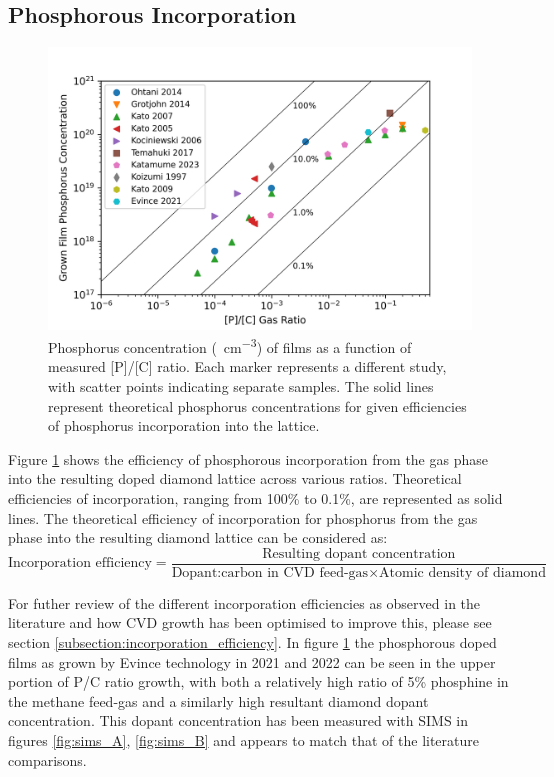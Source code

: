 \begin{refsection}
\subsection{Phosphorous Incorporation}
\begin{figure}[H]
\centering
\includegraphics[width=\textwidth]{grown concentration vs gas ratio.png}
\caption{Phosphorus concentration (\si{\atoms\per\centi\metre\cubed}) of films as a function of measured [P]/[C] ratio. Each marker represents a different study, with scatter points indicating separate samples. The solid lines represent theoretical phosphorus concentrations for given efficiencies of phosphorus incorporation into the lattice. \cite{ohtani2014,grotjohn2014,kato2007,kato2005, kociniewski2006, temahuki2017, katamune2023, koizumi1997, kato2009}}
\label{fig:phos_concentration}
\end{figure}
Figure \ref{fig:phos_concentration} shows the efficiency of phosphorous incorporation from the gas phase into the resulting doped diamond lattice across various ratios. Theoretical efficiencies of incorporation, ranging from 100\% to 0.1\%, are represented as solid lines. The theoretical efficiency of incorporation for phosphorus from the gas phase into the resulting diamond lattice can be considered as:
\begin{equation}
\label{eq:incorporation_breakdown}
    \text{Incorporation efficiency} = \frac{\text{Resulting dopant concentration}}{\text{Dopant:carbon in CVD feed-gas} \times \text{Atomic density of diamond}}
\end{equation}

For futher review of the different incorporation efficiencies as observed in the literature and how CVD growth has been optimised to improve this, please see section \ref{subsection:incorporation_efficiency}. In figure \ref{fig:phos_concentration} the phosphorous doped films as grown by Evince technology in 2021 and 2022 can be seen in the upper portion of P/C ratio growth, with both a relatively high ratio of 5\% phosphine in the methane feed-gas and a similarly high resultant diamond dopant concentration. This dopant concentration has been measured with SIMS in figures \ref{fig:sims_A}, \ref{fig:sims_B} and appears to match that of the literature comparisons.


\end{refsection}
